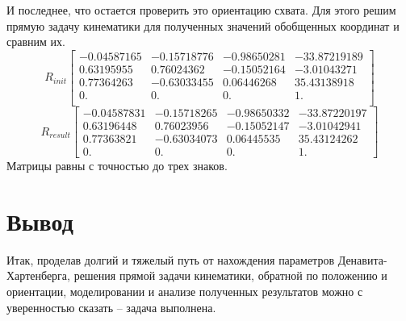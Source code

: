 \documentclass[a4paper,14pt]{extreport}
\begin{document}
	И последнее, что остается проверить это ориентацию схвата. Для этого решим прямую задачу кинематики для полученных значений обобщенных координат и сравним их.
	\begin{equation}
		R_{init}
		\begin{bmatrix}
			-0.04587165 & -0.15718776 & -0.98650281 & -33.87219189\\
			0.63195955 &  0.76024362 & -0.15052164 & -3.01043271\\
			0.77364263 & -0.63033455 &  0.06446268 & 35.43138918\\
			0. & 0. & 0. & 1. \\
		\end{bmatrix}		
	\end{equation}	
	\begin{equation}
		R_{result}
		\begin{bmatrix}
		-0.04587831 & -0.15718265 & -0.98650332& -33.87220197\\
		0.63196448 &  0.76023956 & -0.15052147 & -3.01042941\\
		0.77363821 & -0.63034073 &  0.06445535 & 35.43124262\\
		0.         &  0.         &  0.        &   1.        
		\end{bmatrix}		
	\end{equation}	
	Матрицы равны с точностью до трех знаков.
	
	\section{Вывод}
	
	Итак, проделав долгий и тяжелый путь от нахождения параметров Денавита-Хартенберга, решения прямой задачи кинематики, обратной по положению и ориентации, моделировании и анализе полученных результатов можно с уверенностью сказать -- задача выполнена. 
	
\end{document}
